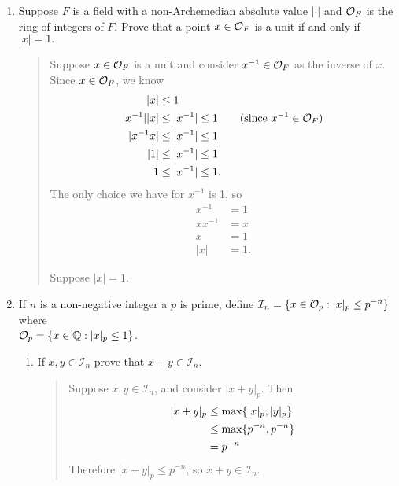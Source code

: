 \documentclass{hw}
\begin{document}
    \begin{enumerate}
        \item Suppose $F$ is a field with a non-Archemedian absolute value $|\cdot|$ and $\mathcal{O}_{F}$ is the ring of
        integers of $F$. Prove that a point $x\in\mathcal{O}_{F}$ is a unit if and only if $|x|=1.$
        \begin{quote}
            Suppose $x\in\mathcal{O}_{F}$ is a unit and consider $x^{-1}\in\mathcal{O}_{F}$ as the inverse of $x$. Since $x\in\mathcal{O}_{F}$, we know
            \begin{align*}
                |x| &\leq 1\\
                |x^{-1}||x| &\leq |x^{-1}|\leq1 \qquad\text{(since $x^{-1}\in\mathcal{O}_{F}$)}\\
                |x^{-1}x| &\leq |x^{-1}|\leq1\\
                |1| &\leq |x^{-1}| \leq1\\
                1 &\leq |x^{-1}| \leq 1.
            \end{align*}
            The only choice we have for $x^{-1}$ is 1, so
            \begin{align*}
                x^{-1} &= 1\\
                xx^{-1}&= x\\
                x&=1\\
                |x|&=1.
            \end{align*}

            Suppose $|x| = 1$.
        \end{quote}

        \item If $n$ is a non-negative integer a $p$ is prime, define
        $\mathcal{I}_{n}=\{x\in\mathcal{O}_{p}:|x|_{p}\leq p^{-n}\}$ where\\ $\mathcal{O}_{p}=\{x\in\mathbb{Q} : |x|_{p}\leq1\}$.
        \begin{enumerate}
            \item If $x,y\in\mathcal{I}_{n}$ prove that $x+y\in\mathcal{I}_{n}$.
            \begin{quote}
                Suppose $x,y\in\mathcal{I}_{n}$, and consider $|x+y|_{p}$. Then
                \begin{align*}
                    |x+y|_{p} &\leq \text{max}\{ |x|_{p} , |y|_{p} \}\\
                    &\leq \text{max}\{ p^{-n} , p^{-n} \}\\
                    &= p^{-n}
                \end{align*}
                Therefore $|x+y|_{p}\leq p^{-n}$, so $x+y\in\mathcal{I}_{n}$.
            \end{quote}


\end{enumerate}
\end{enumerate}
\end{document}
